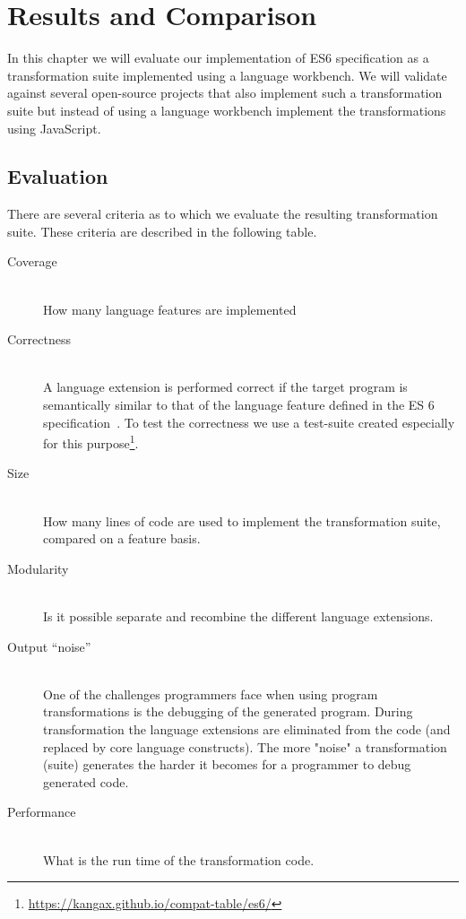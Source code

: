 
\chapter{Results and Comparison} %

\label{Chapter6}


In this chapter we will evaluate our implementation of ES6 specification as a transformation suite implemented using a language workbench. We will validate against several open-source projects that also implement such a transformation suite but instead of using a language workbench implement the transformations using JavaScript.

\section{Evaluation}

There are several criteria as to which we evaluate the resulting transformation suite. These criteria are described in the following table.

\begin{description}
\item[Coverage] \hfill \\ How many language features are implemented
\item[Correctness] \hfill \\ A language extension is performed correct if the target program is semantically similar to that of the language feature defined in the ES 6 specification~\cite{SpecJS}. To test the correctness we use a test-suite created especially for this purpose\footnote{\url{https://kangax.github.io/compat-table/es6/}}.
\item[Size] \hfill \\ How many lines of code are used to implement the transformation suite, compared on a feature basis.
\item[Modularity] \hfill \\ Is it possible separate and recombine the different language extensions.
\item[Output ``noise''] \hfill \\ One of the challenges programmers face when using program transformations is the debugging of the generated program. During transformation the language extensions are eliminated from the code (and replaced by core language constructs). The more "noise" a transformation (suite) generates the harder it becomes for a programmer to debug generated code.
\item[Performance] \hfill \\ What is the run time of the transformation code.
\end{description}


